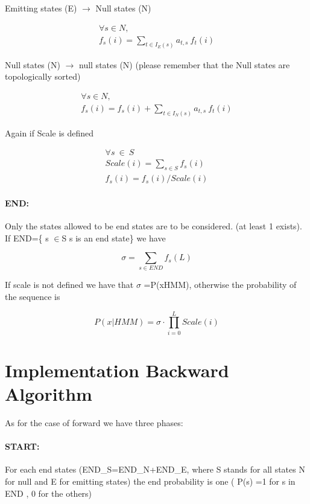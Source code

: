 \documentclass[11pt,english]{article}
\begin{document}
Emitting states (E) \( \rightarrow  \) Null states (N) 

\[
\begin{array}{c}
\forall s\in N,\\
f_{s}(i)=\sum _{t\in I_{E}(s)}a_{t,s}\: f_{t}(i)
\end{array}\]


Null states (N) \( \rightarrow  \) null states (N) 
(please remember that the Null states are topologically sorted) 

\[
\begin{array}{c}
\forall s\in N,\\
f_{s}(i)=f_{s}(i)+\sum _{t\in I_{N}(s)}a_{t,s}\: f_{t}(i)
\end{array}\]


Again if Scale is defined 

\[
\begin{array}{c}
\forall s\: \in \: S\: \: \: \: \: \: \: \: \: \: \: \: \: \: \: \\
Scale(i)=\sum _{s\in S}f_{s}(i)\\
f_{s}(i)=f_{s}(i)/Scale(i)
\end{array}\]



\paragraph{END:}

Only the states allowed to be end states are to be considered.
(at least 1 exists). If 
END=\{ s \( \in  \)S \textbar{} s is an end state\}
we have

\[
\sigma =\sum _{s\in END}f_{s}(L)\]

If scale is not defined we have that
\( \sigma  \) =P(x\textbar{}HMM), otherwise
the probability of the sequence is

\[
P(x|HMM)=\sigma \cdot \prod _{i=0}^{L}Scale(i)\]


\section{Implementation Backward Algorithm}

As for the case of forward we have three phases:

\paragraph{START:}

For each end states (END\_S=END\_N+END\_E, where S stands for
all states N for null and E for emitting states) the end probability is
one ( P(s) =1 for s in END , 0 for the others)
\end{document}
